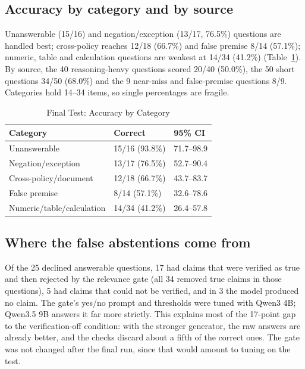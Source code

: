 \documentclass[conference]{IEEEtran}
\begin{document}
\subsection{Accuracy by category and by source}
Unanswerable (15/16) and negation/exception (13/17, 76.5\%) questions are handled best; cross-policy
reaches 12/18 (66.7\%) and false premise 8/14 (57.1\%); numeric, table and calculation questions are weakest
at 14/34 (41.2\%) (Table~\ref{tab:cat}). By source, the 40 reasoning-heavy questions scored 20/40 (50.0\%),
the 50 short questions 34/50 (68.0\%) and the 9 near-miss and false-premise questions 8/9. Categories hold
14--34 items, so single percentages are fragile.

\begin{table}[t]
\caption{Final Test: Accuracy by Category}
\label{tab:cat}
\centering\scriptsize
\begin{tabular}{@{}lll@{}}
\toprule
Category & Correct & 95\% CI\\
\midrule
Unanswerable & 15/16 (93.8\%) & 71.7--98.9\\
Negation/exception & 13/17 (76.5\%) & 52.7--90.4\\
Cross-policy/document & 12/18 (66.7\%) & 43.7--83.7\\
False premise & 8/14 (57.1\%) & 32.6--78.6\\
Numeric/table/calculation & 14/34 (41.2\%) & 26.4--57.8\\
\bottomrule
\end{tabular}
\end{table}

\subsection{Where the false abstentions come from}
Of the 25 declined answerable questions, 17 had claims that were verified as true and then rejected by the
relevance gate (all 34 removed true claims in those questions), 5 had claims that could not be verified, and
in 3 the model produced no claim. The gate's yes/no prompt and thresholds were tuned with Qwen3 4B; Qwen3.5
9B answers it far more strictly. This explains most of the 17-point gap to the verification-off condition:
with the stronger generator, the raw answers are already better, and the checks discard about a fifth of
the correct ones. The gate was not changed after the final run, since that would amount to tuning on the
test.
\end{document}
